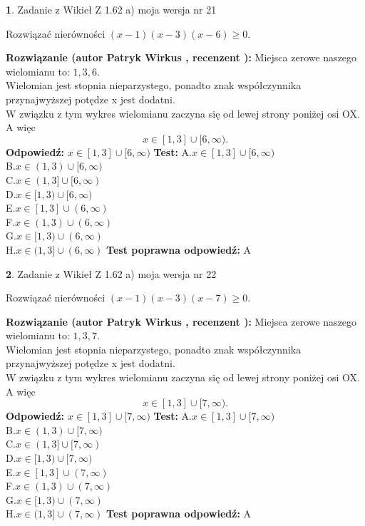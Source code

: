 \documentclass[12pt, a4paper]{article}
\theoremstyle{definition} %
\newtheorem{zad}{}
\newcommand{\zadStart}[1]{\begin{zad}#1\newline}
\newcommand{\zadStop}{\end{zad}}
\newcommand{\rozwStart}[2]{\noindent \textbf{Rozwiązanie (autor #1 , recenzent #2): }\newline}
\newcommand{\rozwStop}{\newline}
\newcommand{\odpStart}{\noindent \textbf{Odpowiedź:}\newline}
\newcommand{\odpStop}{\newline}
\newcommand{\testStart}{\noindent \textbf{Test:}\newline}
\newcommand{\testStop}{\newline}
\newcommand{\kluczStart}{\noindent \textbf{Test poprawna odpowiedź:}\newline}
\newcommand{\kluczStop}{\newline}
\begin{document}
\zadStart{Zadanie z Wikieł Z 1.62 a) moja wersja nr 21}

Rozwiązać nierówności $(x-1)(x-3)(x-6)\ge0$.
\zadStop
\rozwStart{Patryk Wirkus}{}
Miejsca zerowe naszego wielomianu to: $1, 3, 6$.\\
Wielomian jest stopnia nieparzystego, ponadto znak współczynnika przy\linebreak najwyższej potędze x jest dodatni.\\ W związku z tym wykres wielomianu zaczyna się od lewej strony poniżej osi OX. A więc $$x \in [1,3] \cup [6,\infty).$$
\rozwStop
\odpStart
$x \in [1,3] \cup [6,\infty)$
\odpStop
\testStart
A.$x \in [1,3] \cup [6,\infty)$\\
B.$x \in (1,3) \cup [6,\infty)$\\
C.$x \in (1,3] \cup [6,\infty)$\\
D.$x \in [1,3) \cup [6,\infty)$\\
E.$x \in [1,3] \cup (6,\infty)$\\
F.$x \in (1,3) \cup (6,\infty)$\\
G.$x \in [1,3) \cup (6,\infty)$\\
H.$x \in (1,3] \cup (6,\infty)$
\testStop
\kluczStart
A
\kluczStop



\zadStart{Zadanie z Wikieł Z 1.62 a) moja wersja nr 22}

Rozwiązać nierówności $(x-1)(x-3)(x-7)\ge0$.
\zadStop
\rozwStart{Patryk Wirkus}{}
Miejsca zerowe naszego wielomianu to: $1, 3, 7$.\\
Wielomian jest stopnia nieparzystego, ponadto znak współczynnika przy\linebreak najwyższej potędze x jest dodatni.\\ W związku z tym wykres wielomianu zaczyna się od lewej strony poniżej osi OX. A więc $$x \in [1,3] \cup [7,\infty).$$
\rozwStop
\odpStart
$x \in [1,3] \cup [7,\infty)$
\odpStop
\testStart
A.$x \in [1,3] \cup [7,\infty)$\\
B.$x \in (1,3) \cup [7,\infty)$\\
C.$x \in (1,3] \cup [7,\infty)$\\
D.$x \in [1,3) \cup [7,\infty)$\\
E.$x \in [1,3] \cup (7,\infty)$\\
F.$x \in (1,3) \cup (7,\infty)$\\
G.$x \in [1,3) \cup (7,\infty)$\\
H.$x \in (1,3] \cup (7,\infty)$
\testStop
\kluczStart
A
\kluczStop
\end{document}

